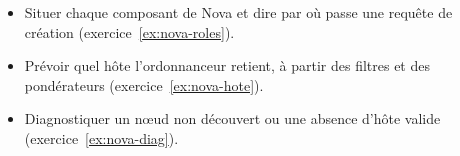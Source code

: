 \begin{savoirfaire}
\begin{itemize}
  \item Situer chaque composant de Nova et dire par où passe une requête de création
        (exercice~\ref{ex:nova-roles}).
  \item Prévoir quel hôte l'ordonnanceur retient, à partir des filtres et des pondérateurs
        (exercice~\ref{ex:nova-hote}).
  \item Diagnostiquer un nœud non découvert ou une absence d'hôte valide (exercice~\ref{ex:nova-diag}).
\end{itemize}
\end{savoirfaire}
